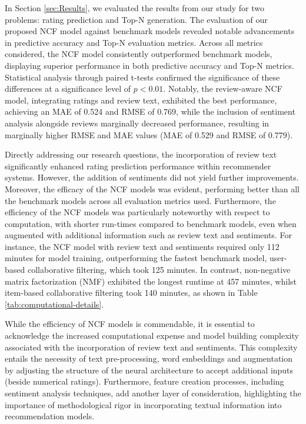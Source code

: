 In Section \ref{sec:Results}, we evaluated the results from our study for two problems: rating prediction and Top-N generation. The evaluation of our proposed NCF model against benchmark models revealed notable advancements in predictive accuracy and Top-N evaluation metrics. Across all metrics considered, the NCF model consistently outperformed benchmark models, displaying superior performance in both predictive accuracy and Top-N metrics. Statistical analysis through paired t-tests confirmed the significance of these differences at a significance level of $p<0.01$. Notably, the review-aware NCF model, integrating ratings and review text, exhibited the best performance, achieving an MAE of 0.524 and RMSE of 0.769, while the inclusion of sentiment analysis alongside reviews marginally decreased performance, resulting in marginally higher RMSE and MAE values (MAE of 0.529 and RMSE of 0.779).

Directly addressing our research questions, the incorporation of review text significantly enhanced rating prediction performance within recommender systems. However, the addition of sentiments did not yield further improvements. Moreover, the efficacy of the NCF models was evident, performing better than all the benchmark models across all evaluation metrics used. Furthermore, the efficiency of the NCF models was particularly noteworthy with respect to computation, with shorter run-times compared to benchmark models, even when augmented with additional information such as review text and sentiments. For instance, the NCF model with review text and sentiments required only 112 minutes for model training, outperforming the fastest benchmark model, user-based collaborative filtering, which took 125 minutes. In contrast, non-negative matrix factorization (NMF) exhibited the longest runtime at 457 minutes, whilst item-based collaborative filtering took 140 minutes, as shown in Table \ref{tab:computational-details}.

While the efficiency of NCF models is commendable, it is essential to acknowledge the increased computational expense and model building complexity associated with the incorporation of review text and sentiments. This complexity entails the necessity of text pre-processing, word embeddings and augmentation by adjusting the structure of the neural architecture to accept additional inputs (beside numerical ratings). Furthermore, feature creation processes, including sentiment analysis techniques, add another layer of consideration, highlighting the importance of methodological rigor in incorporating textual information into recommendation models. 


